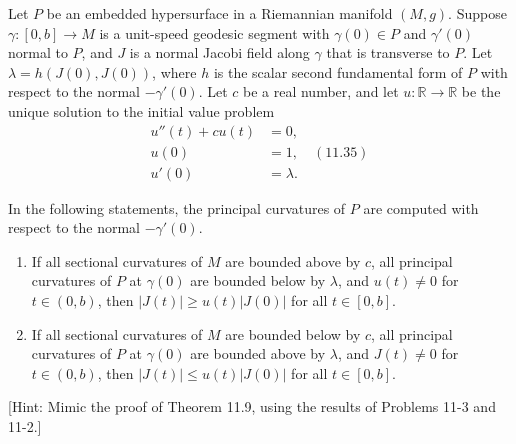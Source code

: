 \begin{exercise}\label{prob:transverse-jacobi-comparison}
Let $P$ be an embedded hypersurface in a Riemannian manifold $(M, g)$. Suppose $\gamma: [0, b] \to M$ is a unit-speed geodesic segment with $\gamma(0) \in P$ and $\gamma'(0)$ normal to $P$, and $J$ is a normal Jacobi field along $\gamma$ that is transverse to $P$. Let $\lambda = h(J(0), J(0))$, where $h$ is the scalar second fundamental form of $P$ with respect to the normal $-\gamma'(0)$. Let $c$ be a real number, and let $u: \mathbb{R} \to \mathbb{R}$ be the unique solution to the initial value problem
\[
\begin{aligned}
u''(t) + cu(t) &= 0, \\
u(0) &= 1, \quad (11.35) \\
u'(0) &= \lambda.
\end{aligned}
\]

In the following statements, the principal curvatures of $P$ are computed with respect to the normal $-\gamma'(0)$.

\begin{enumerate}
\item[(a)] If all sectional curvatures of $M$ are bounded above by $c$, all principal curvatures of $P$ at $\gamma(0)$ are bounded below by $\lambda$, and $u(t) \neq 0$ for $t \in (0, b)$, then $|J(t)| \geq u(t)|J(0)|$ for all $t \in [0, b]$.

\item[(b)] If all sectional curvatures of $M$ are bounded below by $c$, all principal curvatures of $P$ at $\gamma(0)$ are bounded above by $\lambda$, and $J(t) \neq 0$ for $t \in (0, b)$, then $|J(t)| \leq u(t)|J(0)|$ for all $t \in [0, b]$.
\end{enumerate}

[Hint: Mimic the proof of Theorem 11.9, using the results of Problems 11-3 and 11-2.]
\end{exercise}
